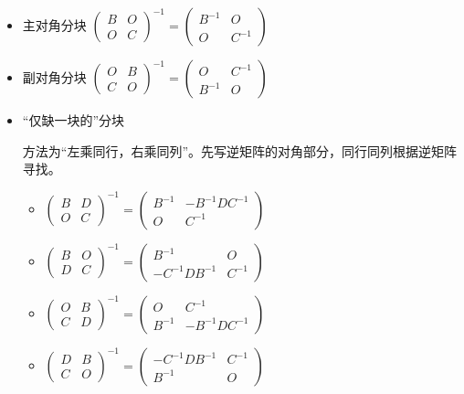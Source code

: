 \begin{itemize}
    \item 主对角分块
    $ \begin{pmatrix}
    B&O\\O&C
    \end{pmatrix}^{-1} = \begin{pmatrix}
        B^{-1}&O\\O&C^{-1}
    \end{pmatrix} $ 
    \item 副对角分块
    $ \begin{pmatrix}
        O&B\\C&O
    \end{pmatrix}^{-1} = 
    \begin{pmatrix}
        O & C^{-1} \\ B^{-1} & O
    \end{pmatrix} $ 
    \item “仅缺一块的”分块
    
    方法为“左乘同行，右乘同列”。先写逆矩阵的对角部分，同行同列根据逆矩阵寻找。
    \begin{itemize}
        \item $ 
        \begin{pmatrix}
        B & D  \\ O & C   
        \end{pmatrix}^{-1} = 
        \begin{pmatrix}
        B^{-1} & -B^{-1}DC^{-1} \\ O & C^{-1}
        \end{pmatrix} $ 
        \item $ 
        \begin{pmatrix}
        B & O \\ D & C   
        \end{pmatrix}^{-1} = 
        \begin{pmatrix}
        B^{-1} & O \\ -C^{-1}DB^{-1} & C^{-1}
        \end{pmatrix} $ 
        \item $ 
        \begin{pmatrix}
        O & B \\ C & D
        \end{pmatrix}^{-1} = 
        \begin{pmatrix}
        O & C^{-1} \\ B^{-1} & -B^{-1}DC^{-1}
        \end{pmatrix} $ 
        \item $ 
        \begin{pmatrix}
        D & B \\ C & O
        \end{pmatrix}^{-1} = 
        \begin{pmatrix}
        -C^{-1}DB^{-1} & C^{-1} \\ B^{-1} & O
        \end{pmatrix} $ 
    \end{itemize}
\end{itemize}

